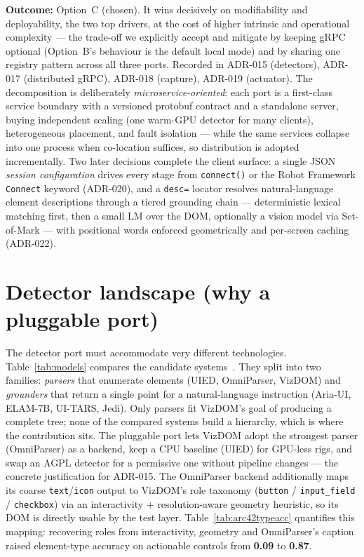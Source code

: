 \documentclass[11pt,a4paper]{report}
\newcommand{\code}[1]{\texttt{#1}}
\begin{document}
\textbf{Outcome:} Option~C (chosen). It wins decisively on modifiability and
deployability, the two top drivers, at the cost of higher intrinsic and operational
complexity --- the trade-off we explicitly accept and mitigate by keeping gRPC
optional (Option~B's behaviour is the default local mode) and by sharing one
registry pattern across all three ports. Recorded in ADR-015 (detectors), ADR-017
(distributed gRPC), ADR-018 (capture), ADR-019 (actuator). The decomposition is
deliberately \emph{microservice-oriented}: each port is a first-class service
boundary with a versioned protobuf contract and a standalone server, buying
independent scaling (one warm-GPU detector for many clients), heterogeneous
placement, and fault isolation --- while the same services collapse into one
process when co-location suffices, so distribution is adopted incrementally.
Two later decisions complete the client surface: a single JSON \emph{session
configuration} drives every stage from \code{connect()} or the Robot Framework
\code{Connect} keyword (ADR-020), and a \code{desc=} locator resolves
natural-language element descriptions through a tiered grounding chain ---
deterministic lexical matching first, then a small LM over the DOM, optionally a
vision model via Set-of-Mark --- with positional words enforced geometrically and
per-screen caching (ADR-022).

\section{Detector landscape (why a pluggable port)}
The detector port must accommodate very different technologies. Table~\ref{tab:models}
compares the candidate systems~\cite{xie2020uied,omniparser2024,ariaui2024,elam7b,uitars2025,osworldg}.
They split into two families: \emph{parsers} that enumerate elements (UIED,
OmniParser, VizDOM) and \emph{grounders} that return a single point for a
natural-language instruction (Aria-UI, ELAM-7B, UI-TARS, Jedi). Only parsers fit VizDOM's
goal of producing a complete tree; none of the compared systems build a hierarchy,
which is where the contribution sits. The pluggable port lets VizDOM adopt the
strongest parser (OmniParser) as a backend, keep a CPU baseline (UIED) for
GPU-less rigs, and swap an AGPL detector for a permissive one without pipeline
changes --- the concrete justification for ADR-015. The OmniParser backend
additionally maps its coarse \code{text}/\code{icon} output to VizDOM's role
taxonomy (\code{button} / \code{input\_field} / \code{checkbox}) via an
interactivity + resolution-aware geometry heuristic, so its DOM is directly usable
by the test layer. Table~\ref{tab:arc42typeacc} quantifies this mapping: recovering
roles from interactivity, geometry and OmniParser's caption raised element-type
accuracy on actionable controls from \textbf{0.09} to \textbf{0.87}.
\end{document}
